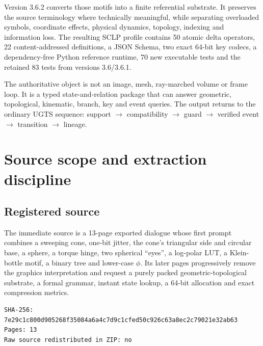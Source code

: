 \documentclass[10pt,a4paper]{article}
\begin{document}
Version 3.6.2 converts those motifs into a finite referential substrate. It preserves the source terminology where technically meaningful, while separating overloaded symbols, coordinate effects, physical dynamics, topology, indexing and information loss. The resulting SCLP profile contains 50 atomic delta operators, 22 content-addressed definitions, a JSON Schema, two exact 64-bit key codecs, a dependency-free Python reference runtime, 70 new executable tests and the retained 83 tests from versions 3.6/3.6.1.

\begin{decisionbox}
The authoritative object is not an image, mesh, ray-marched volume or frame loop. It is a typed state-and-relation package that can answer geometric, topological, kinematic, branch, key and event queries. The output returns to the ordinary UGTS sequence: support $\rightarrow$ compatibility $\rightarrow$ guard $\rightarrow$ verified event $\rightarrow$ transition $\rightarrow$ lineage.
\end{decisionbox}

\tableofcontents
\clearpage
{}

\section{Source scope and extraction discipline}

\subsection{Registered source}
The immediate source is a 13-page exported dialogue whose first prompt combines a sweeping cone, one-bit jitter, the cone's triangular side and circular base, a sphere, a torque hinge, two spherical ``eyes'', a log-polar LUT, a Klein-bottle motif, a binary tree and lower-case $\phi$. Its later pages progressively remove the graphics interpretation and request a purely packed geometric-topological substrate, a formal grammar, instant state lookup, a 64-bit allocation and exact compression metrics.

\begin{Verbatim}[breaklines=true,fontsize=\small]
SHA-256: 7e29c1c800d905268f35084a6a4c7d9c1cfed50c926c63a8ec2c79021e32ab63
Pages: 13
Raw source redistributed in ZIP: no
\end{Verbatim}
\end{document}
